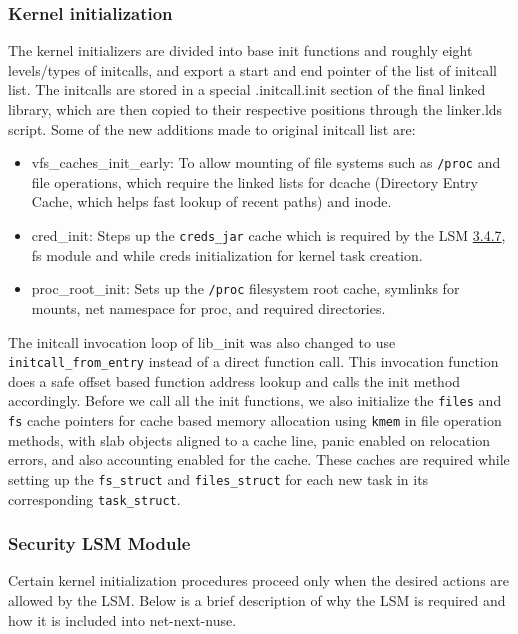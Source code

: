 \documentclass{sig-alternate}
\begin{document}
\subsubsection{Kernel initialization}
The kernel initializers are divided into base init functions and roughly eight levels/types of initcalls, and export a start and end pointer of the list of initcall list. 
The initcalls are stored in a special .initcall.init section of the final linked library, which are then copied to their respective positions through the linker.lds script.
Some of the new additions made to original initcall list are: 

\begin{itemize}
  \item vfs\_caches\_init\_early: To allow mounting of file systems such as \texttt{/proc} and file operations, which require the linked lists for 
  dcache (Directory Entry Cache, which helps fast lookup of recent paths) and inode.
  \item cred\_init: Steps up the \texttt{creds\_jar} cache which is required by the LSM \hyperref[Section_LSM]{3.4.7}, fs module and 
  while creds initialization for kernel task creation.
  \item proc\_root\_init: Sets up the \texttt{/proc} filesystem root cache, symlinks for mounts, net namespace for proc, and required directories.
\end{itemize}

The initcall invocation loop of lib\_init was also changed to use \texttt{initcall\_from\_entry} instead of a direct function call. 
This invocation function does a safe offset based function address lookup and calls the init method accordingly. 
Before we call all the init functions, we also initialize the \texttt{files} and \texttt{fs} cache pointers for cache based memory 
allocation using \texttt{kmem} in file operation methods, with slab objects aligned to a cache line, panic enabled on relocation errors, and also accounting enabled 
for the cache. These caches are required while setting up the \texttt{fs\_struct} and \texttt{files\_struct} for each new task in its 
corresponding \texttt{task\_struct}. 

\subsubsection{Security LSM Module}\label{Section_LSM}
Certain kernel initialization procedures proceed only when the desired actions are allowed by the LSM. Below is a brief description of why the LSM is required and how 
it is included into net-next-nuse.
\end{document}
